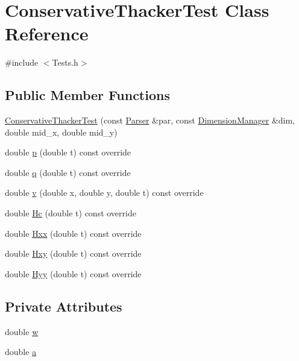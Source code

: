 \hypertarget{classConservativeThackerTest}{}\section{Conservative\+Thacker\+Test Class Reference}
\label{classConservativeThackerTest}


{\ttfamily \#include $<$Tests.\+h$>$}

\subsection*{Public Member Functions}
\begin{DoxyCompactItemize}
\item 
\hyperlink{classConservativeThackerTest_a43e6d71d814240a4ac221656fe5813c6}{Conservative\+Thacker\+Test} (const \hyperlink{structParser}{Parser} \&par, const \hyperlink{structDimensionManager}{Dimension\+Manager} \&dim, double mid\+\_\+x, double mid\+\_\+y)
\item 
double \hyperlink{classConservativeThackerTest_a86df7e9b8603fbdc5a00341f27428a70}{p} (double t) const override
\item 
double \hyperlink{classConservativeThackerTest_a04b3e568727e6ccbfbe5ee13e08cd69c}{q} (double t) const override
\item 
double \hyperlink{classConservativeThackerTest_ada42cdb161739dc9b831eac7af8312a3}{v} (double x, double y, double t) const override
\item 
double \hyperlink{classConservativeThackerTest_ab2be6c9605361b6cbc446499cd098814}{Hc} (double t) const override
\item 
double \hyperlink{classConservativeThackerTest_a578c112c91fc753f5cd550fca2603f8a}{Hxx} (double t) const override
\item 
double \hyperlink{classConservativeThackerTest_a43d5a3defc104c6581cf540e391a2e5e}{Hxy} (double t) const override
\item 
double \hyperlink{classConservativeThackerTest_ae1a06fc8ea9fe64578cd59e0aa7cdcc3}{Hyy} (double t) const override
\end{DoxyCompactItemize}
\subsection*{Private Attributes}
\begin{DoxyCompactItemize}
\item 
double \hyperlink{classConservativeThackerTest_a7ee89cb012c8e7c1a6c171bb546eba55}{w}
\item 
double \hyperlink{classConservativeThackerTest_a072f15b9858803213064d262d61bfda7}{a}
\end{DoxyCompactItemize}
